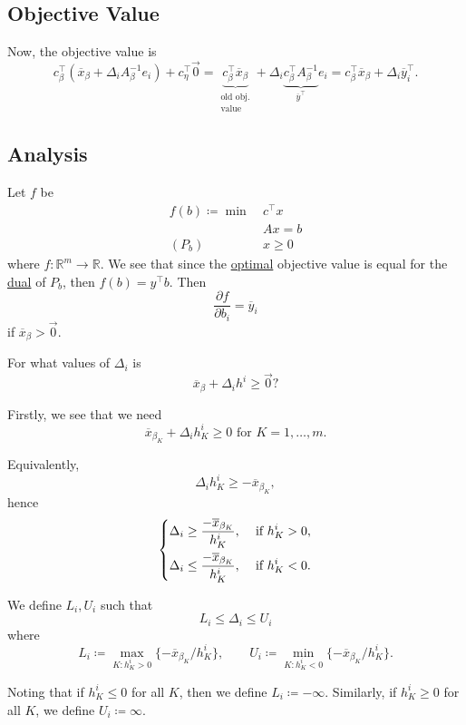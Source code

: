\subsection{Objective Value}
Now, the objective value is
\[
	c_{\beta}^{\top}(\overline{x}_{\beta}+\Delta_{i}A_{\beta}^{-1}e_{i})+ c_{\eta}^{\top}\vec{0}
	= \underbrace{c_{\beta}^{\top}\overline{x}_{\beta}}_{\substack{\text{old obj.}\\\text{value}}}+\Delta_{i}\underbrace{c_{\beta}^{\top}A_{\beta}^{-1}}_{\overline{y}^{\top}}e_{i}
	= c_{\beta}^{\top}\overline{x}_{\beta}+\Delta_{i}\overline{y}^{\top}_i.
\]

\subsection{Analysis}
Let \(f\) be
\[
	\begin{aligned}
		f(b)\coloneqq \min~ & c^{\top}x \\
		                    & Ax = b    \\
		(P_b)\quad          & x\geq 0
	\end{aligned}
\]
where \(f\colon \mathbb{R}^{m}\to \mathbb{R}\). We see that since the \hyperref[def:optimal-solution]{optimal} objective value is equal for the \hyperref[def:dual]{dual} of \(P_b\), then \(f(b) = y^{\top}b\). Then
\[
	\frac{\partial f}{\partial b_{i}} = \overline{y}_i
\]
if \(\overline{x}_{\beta}>\vec{0}\).

\begin{problem*}
	For what values of \(\Delta_{i}\) is
	\[
		\overline{x}_{\beta} + \Delta_{i}h^i \geq \vec{0}?
	\]
\end{problem*}
\begin{answer}
	Firstly, we see that we need
	\[
		\overline{x}_{\beta_K}+\Delta_{i}h^i_K \geq 0 \text{ for }K = 1, \ldots , m.
	\]

	Equivalently,
	\[
		\Delta_{i}h^i_K \geq -\overline{x}_{\beta_K},
	\]
	hence
	\[
		\begin{dcases}
			\Delta_{i}\geq \frac{-\overline{x}_{\beta_K}}{h^i_K}, & \text{ if }h^i_K>0, \\
			\Delta_{i}\leq \frac{-\overline{x}_{\beta_K}}{h^i_K}, & \text{ if }h^i_K<0.
		\end{dcases}
	\]

	We define \(L_{i}, U_{i}\) such that
	\[
		L_{i}\leq \Delta_{i}\leq U_{i}
	\]
	where
	\[
		L_{i} \coloneqq \max_{K\colon h^i_K > 0}\{-\overline{x}_{\beta_K}/h^i_K\},\qquad U_{i} \coloneqq \min_{K\colon h^i_K < 0}\{-\overline{x}_{\beta_K}/h^i_K\}.
	\]
\end{answer}
\begin{remark}
	Noting that if \(h^i_K\leq 0\) for all \(K\), then we define \(L_{i} \coloneqq -\infty \). Similarly, if \(h^i_K\geq 0\) for all \(K\), we define \(U_i \coloneqq \infty \).
\end{remark}

